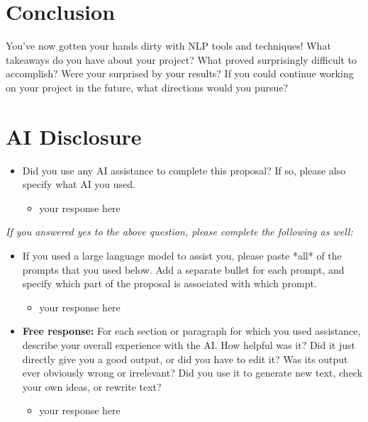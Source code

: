 \documentclass[11pt,a4paper]{article}
\begin{document}
\section{Conclusion}
You've now gotten your hands dirty with NLP tools and techniques! What takeaways do you have about your project? What proved surprisingly difficult to accomplish? Were your surprised by your results? If you could continue working on your project in the future, what directions would you pursue?

\section{AI Disclosure}
\begin{itemize}
    \item Did you use any AI assistance to complete this proposal? If so, please also specify what AI you used.
    \begin{itemize}
        \item your response here
    \end{itemize}
\end{itemize}

\noindent\textit{If you answered yes to the above question, please complete the following as well:}

\begin{itemize}
    \item  If you used a large language model to assist you, please paste *all* of the prompts that you used below. Add a separate bullet for each prompt, and specify which part of the proposal is associated with which prompt.
    \begin{itemize}
        \item your response here
    \end{itemize}
    \item \textbf{Free response:} For each section or paragraph for which you used assistance, describe your overall experience with the AI. How helpful was it? Did it just directly give you a good output, or did you have to edit it? Was its output ever obviously wrong or irrelevant? Did you use it to generate new text, check your own ideas, or rewrite text?
    \begin{itemize}
        \item your response here
    \end{itemize}
\end{itemize}



\footnotesize

\end{document}
